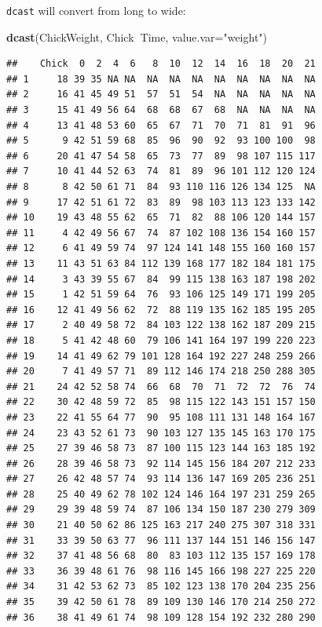 \documentclass[]{book}
\newenvironment{Shaded}{\begin{snugshade}}{\end{snugshade}}
\newcommand{\KeywordTok}[1]{\textcolor[rgb]{0.13,0.29,0.53}{\textbf{#1}}}
\newcommand{\DataTypeTok}[1]{\textcolor[rgb]{0.13,0.29,0.53}{#1}}
\newcommand{\StringTok}[1]{\textcolor[rgb]{0.31,0.60,0.02}{#1}}
\newcommand{\OperatorTok}[1]{\textcolor[rgb]{0.81,0.36,0.00}{\textbf{#1}}}
\newcommand{\NormalTok}[1]{#1}
\theoremstyle{definition}
\theoremstyle{definition}
\theoremstyle{definition}
\theoremstyle{remark}
\begin{document}
\texttt{dcast} will convert from long to wide:

\begin{Shaded}
\begin{Highlighting}[]
\KeywordTok{dcast}\NormalTok{(ChickWeight, Chick}\OperatorTok{~}\NormalTok{Time, }\DataTypeTok{value.var=}\StringTok{"weight"}\NormalTok{)}
\end{Highlighting}
\end{Shaded}

\begin{verbatim}
##    Chick  0  2  4  6   8  10  12  14  16  18  20  21
## 1     18 39 35 NA NA  NA  NA  NA  NA  NA  NA  NA  NA
## 2     16 41 45 49 51  57  51  54  NA  NA  NA  NA  NA
## 3     15 41 49 56 64  68  68  67  68  NA  NA  NA  NA
## 4     13 41 48 53 60  65  67  71  70  71  81  91  96
## 5      9 42 51 59 68  85  96  90  92  93 100 100  98
## 6     20 41 47 54 58  65  73  77  89  98 107 115 117
## 7     10 41 44 52 63  74  81  89  96 101 112 120 124
## 8      8 42 50 61 71  84  93 110 116 126 134 125  NA
## 9     17 42 51 61 72  83  89  98 103 113 123 133 142
## 10    19 43 48 55 62  65  71  82  88 106 120 144 157
## 11     4 42 49 56 67  74  87 102 108 136 154 160 157
## 12     6 41 49 59 74  97 124 141 148 155 160 160 157
## 13    11 43 51 63 84 112 139 168 177 182 184 181 175
## 14     3 43 39 55 67  84  99 115 138 163 187 198 202
## 15     1 42 51 59 64  76  93 106 125 149 171 199 205
## 16    12 41 49 56 62  72  88 119 135 162 185 195 205
## 17     2 40 49 58 72  84 103 122 138 162 187 209 215
## 18     5 41 42 48 60  79 106 141 164 197 199 220 223
## 19    14 41 49 62 79 101 128 164 192 227 248 259 266
## 20     7 41 49 57 71  89 112 146 174 218 250 288 305
## 21    24 42 52 58 74  66  68  70  71  72  72  76  74
## 22    30 42 48 59 72  85  98 115 122 143 151 157 150
## 23    22 41 55 64 77  90  95 108 111 131 148 164 167
## 24    23 43 52 61 73  90 103 127 135 145 163 170 175
## 25    27 39 46 58 73  87 100 115 123 144 163 185 192
## 26    28 39 46 58 73  92 114 145 156 184 207 212 233
## 27    26 42 48 57 74  93 114 136 147 169 205 236 251
## 28    25 40 49 62 78 102 124 146 164 197 231 259 265
## 29    29 39 48 59 74  87 106 134 150 187 230 279 309
## 30    21 40 50 62 86 125 163 217 240 275 307 318 331
## 31    33 39 50 63 77  96 111 137 144 151 146 156 147
## 32    37 41 48 56 68  80  83 103 112 135 157 169 178
## 33    36 39 48 61 76  98 116 145 166 198 227 225 220
## 34    31 42 53 62 73  85 102 123 138 170 204 235 256
## 35    39 42 50 61 78  89 109 130 146 170 214 250 272
## 36    38 41 49 61 74  98 109 128 154 192 232 280 290

\end{verbatim}
\end{document}
